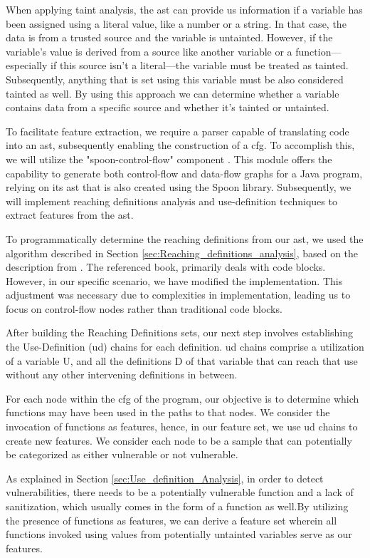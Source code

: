 When applying taint analysis, the \gls{ast} can provide us information if a variable has been assigned using a literal value, like a number or a string. In that case, the data is from a trusted source and the variable is untainted. However, if the variable's value is derived from a source like another variable or a function—especially if this source isn't a literal—the variable must be treated as tainted. Subsequently, anything that is set using this variable must be also considered tainted as well. By using this approach we can determine whether a variable contains data from a specific source and whether  it's tainted or untainted. 

To facilitate feature extraction, we require a parser capable of translating code into an \gls{ast}, subsequently enabling the construction of a \gls{cfg}. To accomplish this, we will utilize the "spoon-control-flow" component \cite{OW2_SPOON}. This module offers the capability to generate both control-flow and data-flow graphs for a Java program, relying on its \gls{ast} that is also created using the Spoon library. Subsequently, we will implement reaching definitions analysis and use-definition techniques to extract features from the \gls{ast}.

To programmatically determine the reaching definitions from our \gls{ast}, we used the algorithm described in Section \ref{sec:Reaching_definitions_analysis}, based on the description from \cite{Alfred_V2007}. The referenced book, primarily deals with code blocks. However, in our specific scenario, we have modified the implementation. This adjustment was necessary due to complexities in implementation, leading us to focus on control-flow nodes rather than traditional code blocks.

After building the Reaching Definitions sets,  our next step involves establishing the Use-Definition (\gls{ud}) chains for each definition. \gls{ud} chains comprise a utilization of a variable U, and all the definitions D of that variable that can reach that use without any other intervening definitions in between.

For each node within the \gls{cfg} of the program, our objective is to determine which functions may have been used in the paths to that nodes. We consider the invocation of functions as features, hence, in our feature set, we use \gls{ud} chains to create new features. We consider each node to be a sample that can potentially be categorized as either vulnerable or not vulnerable. 

As explained in Section \ref{sec:Use_definition_Analysis}, in order to detect vulnerabilities, there needs to be a potentially vulnerable function and a lack of sanitization, which usually comes in the form of a function as well.By utilizing the presence of functions as features, we can derive a feature set wherein all functions invoked using values from potentially untainted variables serve as our features.

